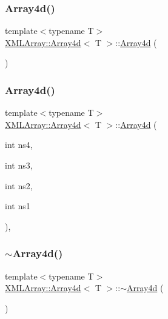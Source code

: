 \subsubsection{\texorpdfstring{Array4d()}{Array4d()}\hspace{0.1cm}{\footnotesize\ttfamily [4/6]}}
{\footnotesize\ttfamily template$<$typename T$>$ \\
\mbox{\hyperlink{classXMLArray_1_1Array4d}{X\+M\+L\+Array\+::\+Array4d}}$<$ T $>$\+::\mbox{\hyperlink{classXMLArray_1_1Array4d}{Array4d}} (\begin{DoxyParamCaption}{ }\end{DoxyParamCaption})\hspace{0.3cm}{\ttfamily [inline]}}

\mbox{\label{classXMLArray_1_1Array4d_a409005374380cbfb8553f3237db7990b}} 
\subsubsection{\texorpdfstring{Array4d()}{Array4d()}\hspace{0.1cm}{\footnotesize\ttfamily [5/6]}}
{\footnotesize\ttfamily template$<$typename T$>$ \\
\mbox{\hyperlink{classXMLArray_1_1Array4d}{X\+M\+L\+Array\+::\+Array4d}}$<$ T $>$\+::\mbox{\hyperlink{classXMLArray_1_1Array4d}{Array4d}} (\begin{DoxyParamCaption}\item[{int}]{ns4,  }\item[{int}]{ns3,  }\item[{int}]{ns2,  }\item[{int}]{ns1 }\end{DoxyParamCaption})\hspace{0.3cm}{\ttfamily [inline]}, {\ttfamily [explicit]}}

\mbox{\label{classXMLArray_1_1Array4d_a80523fcfbd3cf8493a2f5928dd9a3f15}} 
\subsubsection{\texorpdfstring{$\sim$Array4d()}{~Array4d()}\hspace{0.1cm}{\footnotesize\ttfamily [2/2]}}
{\footnotesize\ttfamily template$<$typename T$>$ \\
\mbox{\hyperlink{classXMLArray_1_1Array4d}{X\+M\+L\+Array\+::\+Array4d}}$<$ T $>$\+::$\sim$\mbox{\hyperlink{classXMLArray_1_1Array4d}{Array4d}} (\begin{DoxyParamCaption}{ }\end{DoxyParamCaption})\hspace{0.3cm}{\ttfamily [inline]}}

